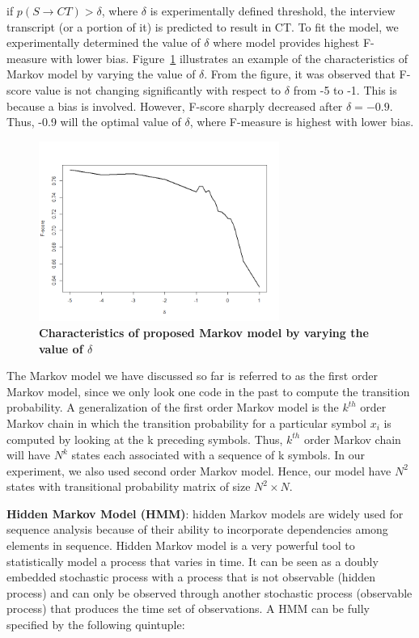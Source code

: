 \documentclass{amia}
\begin{document}
if $p(S\rightarrow CT) > \delta $, where $\delta$ is experimentally defined threshold, the interview transcript (or a portion of it) is predicted to result in CT. To fit the model, we experimentally determined the value of $\delta$ where model provides highest F-measure with lower bias. Figure~\ref{fig:delta} illustrates an example of the characteristics of Markov model by varying the value of $\delta$. From the figure, it was observed that F-score value is not changing significantly with respect to $\delta $ from -5 to -1. This is because a bias is involved. However, F-score sharply decreased after $\delta = -0.9$. Thus, -0.9 will the optimal value of $\delta $, where F-measure is highest with lower bias. 

\begin{figure}[htb!]
    \centering
    \includegraphics[width=0.70\textwidth]{figures/delta.png}
    \caption{\textbf{Characteristics of proposed Markov model by varying the value of $\delta$}}
    \label{fig:delta}
\end{figure}

The Markov model we have discussed so far is referred to as the first order Markov model, since we only look one code in the past to compute the transition probability. A generalization of the first order Markov model is the $k^{th}$ order Markov chain in which the transition probability for a particular symbol $x_i$ is computed by looking at the k preceding symbols. Thus, $k^{th}$ order Markov chain will have $N^{k}$ states each associated with a sequence of k symbols. In our experiment, we also used second order Markov model. Hence, our model have $N^2$ states with transitional probability matrix of size $N^2 \times N$.  

\textbf {Hidden Markov Model (HMM)}: hidden Markov models are widely used for sequence analysis because of their ability to incorporate dependencies among elements in sequence. Hidden Markov model is a very
powerful tool to statistically model a process that varies in time. It can be seen as a doubly embedded stochastic process with a process that is not observable (hidden process) and can only be observed through another stochastic process (observable process) that produces the time set of observations. A HMM can be fully specified by the following quintuple:
\end{document}
